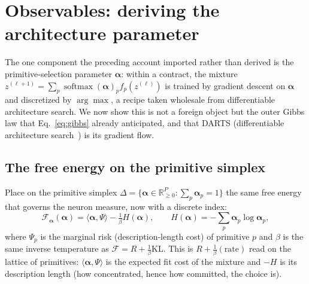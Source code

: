 \documentclass[11pt]{article}
\theoremstyle{definition}
\newcommand{\R}{\mathbb{R}}
\newcommand{\F}{\mathcal{F}}
\newcommand{\KL}{\mathrm{KL}}
\newcommand{\alphapar}{\bm{\alpha}}
\begin{document}
\section{Observables: deriving the architecture parameter}
\label{sec:alpha-derivation}

The one component the preceding account imported rather than derived is the primitive-selection
parameter $\alphapar$: within a contract, the mixture
$z^{(\ell+1)}=\sum_p\operatorname{softmax}(\alphapar)_p f_p(z^{(\ell)})$ is trained by gradient descent
on $\alphapar$ and discretized by $\arg\max$, a recipe taken wholesale from differentiable architecture
search. We now show this is not a foreign object but the outer Gibbs law that
Eq.~\eqref{eq:gibbs} already anticipated, and that DARTS (differentiable architecture search~\cite{liu2019darts}) is its gradient flow.

\subsection{The free energy on the primitive simplex}
Place on the primitive simplex $\Delta=\{\alphapar\in\R^P_{\ge0}:\sum_p\alphapar_p=1\}$ the same free
energy that governs the neuron measure, now with a discrete index:
\begin{equation}
\F_{\alphapar}(\alphapar)=\langle\alphapar,\Psi\rangle-\tfrac{1}{\beta}H(\alphapar),
\qquad H(\alphapar)=-\sum_p\alphapar_p\log\alphapar_p,
\label{eq:Falpha}
\end{equation}
where $\Psi_p$ is the marginal risk (description-length cost) of primitive $p$ and $\beta$ is the same
inverse temperature as $\F=R+\tfrac1\beta\KL$. This is $R+\tfrac1\beta(\text{rate})$ read on the
lattice of primitives: $\langle\alphapar,\Psi\rangle$ is the expected fit cost of the mixture and
$-H$ is its description length (how concentrated, hence how committed, the choice is).
\end{document}

